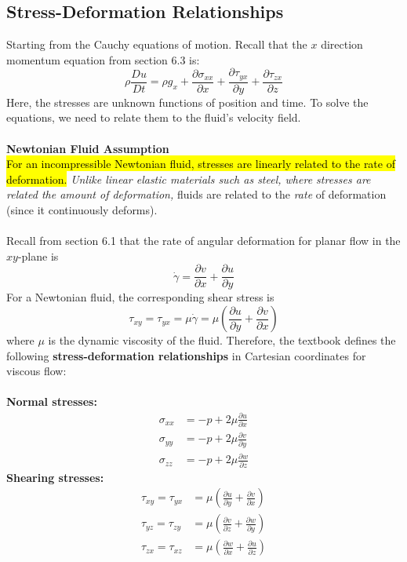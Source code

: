 ﻿\documentclass[12pt]{article}
\begin{document}
\subsection*{Stress-Deformation Relationships}
Starting from the Cauchy equations of motion. Recall that the $x$ direction momentum equation from section 6.3 is:
 \[
\rho\frac{Du}{Dt}=\rho g_x+\frac{\partial\sigma_{xx}}{\partial x}+\frac{\partial\tau_{yx}}{\partial y}+\frac{\partial\tau_{zx}}{\partial z}
\]
Here, the stresses are unknown functions of position and time. To solve the equations, we need to relate them to the fluid's velocity field.\\\\
\textbf{Newtonian Fluid Assumption}\\
\hl{For an incompressible Newtonian fluid, stresses are linearly related to the rate of deformation.} \textit{Unlike linear elastic materials such as steel, where stresses are related the amount of deformation,} fluids are related to the \textit{rate} of deformation (since it continuously deforms).\\\\
Recall from section 6.1 that the rate of angular deformation for planar flow in the $xy$-plane is
\[
\dot\gamma=\frac{\partial v}{\partial x}+\frac{\partial u}{\partial y}
\]
For a Newtonian fluid, the corresponding shear stress is
\[
\boxed{\tau_{xy}=\tau_{yx}=\mu\dot\gamma=\mu\left(\frac{\partial u}{\partial y}+\frac{\partial v}{\partial x}\right)}
\]
where $\mu$ is the dynamic viscosity of the fluid.
\newpage
Therefore, the textbook defines the following \textbf{stress-deformation relationships} in Cartesian coordinates for viscous flow:\\\\
\textbf{Normal stresses:}
\[
\boxed{\begin{aligned}
\sigma_{xx}&=-p+2\mu\frac{\partial u}{\partial x}\\
\sigma_{yy}&=-p+2\mu\frac{\partial v}{\partial y}\\
\sigma_{zz}&=-p+2\mu\frac{\partial w}{\partial z}
\end{aligned}}
\]
\textbf{Shearing stresses:}
\[
\boxed{\begin{aligned}
\tau_{xy}=\tau_{yx}&=\mu\left(\frac{\partial u}{\partial y}+\frac{\partial v}{\partial x}\right)\\
\tau_{yz}=\tau_{zy}&=\mu\left(\frac{\partial v}{\partial z}+\frac{\partial w}{\partial y}\right)\\
\tau_{zx}=\tau_{xz}&=\mu\left(\frac{\partial w}{\partial x}+\frac{\partial u}{\partial z}\right)
\end{aligned}}
\]
\end{document}
